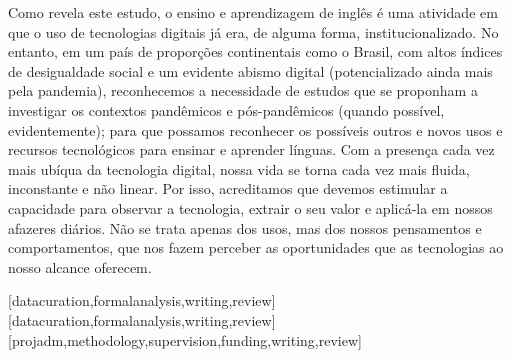 \documentclass[portuguese]{textolivre}
\begin{document}
Como revela este estudo, o ensino e aprendizagem de inglês é uma atividade em que o uso de tecnologias digitais já era, de alguma forma, institucionalizado. No entanto, em um país de proporções continentais como o Brasil, com altos índices de desigualdade social e um evidente abismo digital (potencializado ainda mais pela pandemia), reconhecemos a necessidade de estudos que se proponham a investigar os contextos pandêmicos e pós-pandêmicos (quando possível, evidentemente); para que possamos reconhecer os possíveis outros e novos usos e recursos tecnológicos para ensinar e aprender línguas. Com a presença cada vez mais ubíqua da tecnologia digital, nossa vida se torna cada vez mais fluida, inconstante e não linear. Por isso, acreditamos que devemos estimular a capacidade para observar a tecnologia, extrair o seu valor e aplicá-la em nossos afazeres diários. Não se trata apenas dos usos, mas dos nossos pensamentos e comportamentos, que nos fazem perceber as oportunidades que as tecnologias ao nosso alcance oferecem.


\printbibliography\label{sec-bib}


\begin{contributors}
[datacuration,formalanalysis,writing,review]
[datacuration,formalanalysis,writing,review]
[projadm,methodology,supervision,funding,writing,review]
\end{contributors}
\end{document}
